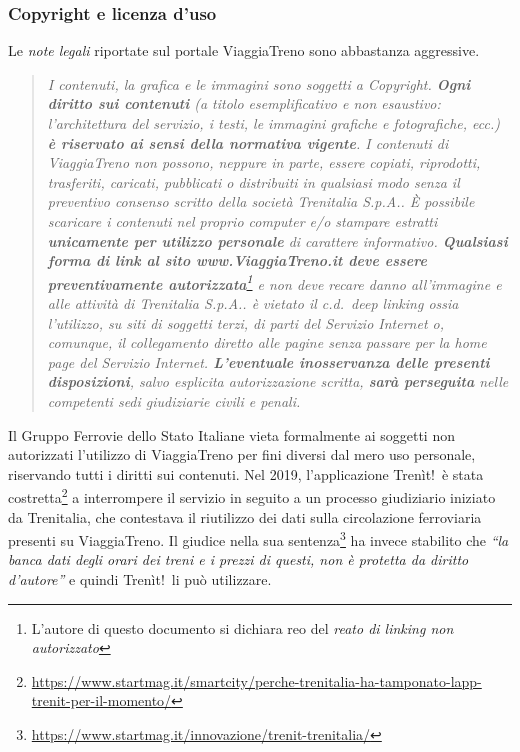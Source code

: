 \documentclass[italian,11pt,a4paper,final]{article}
\begin{document}
	\subsubsection{Copyright e licenza d'uso}
	Le \textit{note legali} riportate sul portale ViaggiaTreno sono abbastanza aggressive.
	\begin{quote}
	\textit{I contenuti, la grafica e le immagini sono soggetti a Copyright. \textbf{Ogni diritto sui contenuti} (a titolo esemplificativo e non esaustivo: l’architettura del servizio, i testi, le immagini grafiche e fotografiche, ecc.) \textbf{è riservato ai sensi della normativa vigente}. I contenuti di ViaggiaTreno non possono, neppure in parte, essere copiati, riprodotti, trasferiti, caricati, pubblicati o distribuiti in qualsiasi modo senza il preventivo consenso scritto della società Trenitalia S.p.A.. È possibile scaricare i contenuti nel proprio computer e/o stampare estratti \textbf{unicamente per utilizzo personale} di carattere informativo. \textbf{Qualsiasi forma di link al sito www.ViaggiaTreno.it deve essere preventivamente autorizzata}\footnote{L'autore di questo documento si dichiara reo del \textit{reato di linking non autorizzato}} e non deve recare danno all'immagine e alle attività di Trenitalia S.p.A.. è vietato il c.d.\ deep linking ossia l'utilizzo, su siti di soggetti terzi, di parti del Servizio Internet o, comunque, il collegamento diretto alle pagine senza passare per la home page del Servizio Internet. \textbf{L'eventuale inosservanza delle presenti disposizioni}, salvo esplicita autorizzazione scritta, \textbf{sarà perseguita} nelle competenti sedi giudiziarie civili e penali.}
	\end{quote}
	Il Gruppo Ferrovie dello Stato Italiane vieta formalmente ai soggetti non autorizzati l'utilizzo di ViaggiaTreno per fini diversi dal mero uso personale, riservando tutti i diritti sui contenuti.
	Nel 2019, l'applicazione Trenìt!\ è stata costretta\footnote{\url{https://www.startmag.it/smartcity/perche-trenitalia-ha-tamponato-lapp-trenit-per-il-momento/}} a interrompere il servizio in seguito a un processo giudiziario iniziato da Trenitalia, che contestava il riutilizzo dei dati sulla circolazione ferroviaria presenti su  ViaggiaTreno.
	Il giudice nella sua sentenza\footnote{\url{https://www.startmag.it/innovazione/trenit-trenitalia/}} ha invece stabilito che \textit{``la banca dati degli orari dei treni e i prezzi di questi, non è protetta da diritto d’autore''} e quindi Trenìt!\ li può utilizzare. \\
	
\end{document}
